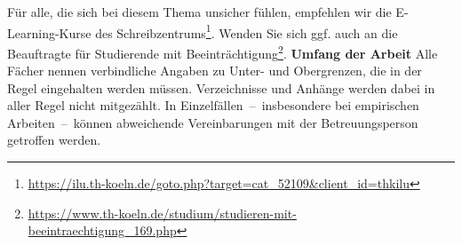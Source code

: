 \par
Für alle, die sich bei diesem Thema unsicher fühlen, empfehlen wir die E-Learning-Kurse des Schreibzentrums\footnote{\href{https://ilu.th-koeln.de/goto.php?target=cat\_52109\&client\_id=thkilu}{https://ilu.th-koeln.de/goto.php?target=cat\_52109\&client\_id=thkilu}}. Wenden Sie sich ggf. auch an die Beauftragte für Studierende mit Beeinträchtigung\footnote{\href{https://www.th-koeln.de/studium/studieren-mit-beeintraechtigung\_169.php}{https://www.th-koeln.de/studium/studieren-mit-beeintraechtigung\_169.php}}.
%
%
\textbf{Umfang der Arbeit}
Alle Fächer nennen verbindliche Angaben zu Unter- und Obergrenzen, die in der Regel eingehalten werden müssen. Verzeichnisse und Anhänge werden dabei in aller Regel nicht mitgezählt. In Einzelfällen~--~insbesondere bei empirischen Arbeiten~--~können abweichende Vereinbarungen mit der Betreuungsperson getroffen werden.